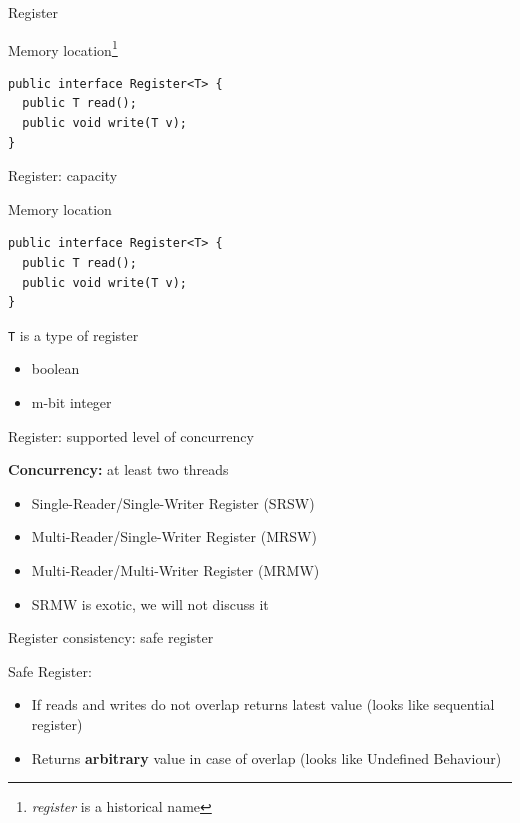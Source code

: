 \begin{frame}[t, fragile]{Register}

Memory location\footnote{\textit{register} is a historical name}

\begin{verbatim}
public interface Register<T> {
  public T read();  
  public void write(T v);
}
\end{verbatim}
\end{frame}

\begin{frame}{Register: capacity}

Memory location

\begin{verbatim}
public interface Register<T> {
  public T read();  
  public void write(T v);
}
\end{verbatim}

\texttt{T} is a type of register
\begin{itemize}
  \item boolean
  \item m-bit integer
\end{itemize}

\end{frame}


\begin{frame}[t]{Register: supported level of concurrency}

\textbf{Concurrency:} at least two threads

\pause

\begin{itemize}
  
  \item Single-Reader/Single-Writer Register \pause (SRSW)
  \pause

  \item Multi-Reader/Single-Writer Register \pause (MRSW)

  \pause
  \item Multi-Reader/Multi-Writer Register \pause (MRMW)

  \pause
  \item SRMW is exotic, we will not discuss it
\end{itemize}

\end{frame}


\begin{frame}[t,fragile]{Register consistency: safe register}

Safe Register:
\begin{itemize}
  \item If reads and writes do not overlap returns latest value (looks like sequential register)
  \pause
  \item Returns \textbf{arbitrary} value in case of overlap (looks like Undefined Behaviour)
\end{itemize}

\end{frame}


